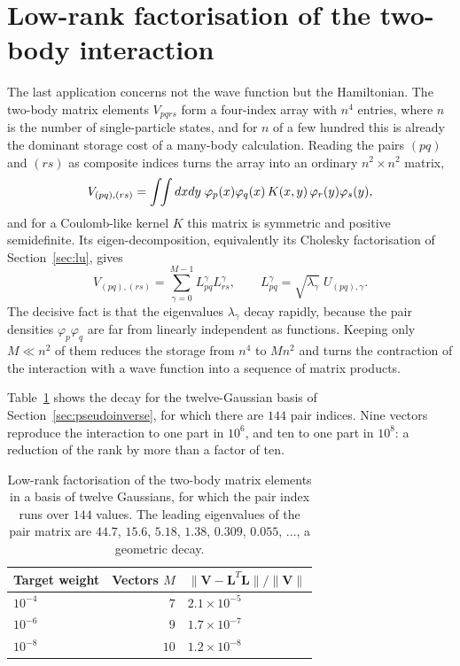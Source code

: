 \section{Low-rank factorisation of the two-body interaction}
\label{sec:twobodyfact}

The last application concerns not the wave function but the Hamiltonian.  The
two-body matrix elements $V_{pqrs}$ form a four-index array with $n^4$
entries, where $n$ is the number of single-particle states, and for $n$ of a
few hundred this is already the dominant storage cost of a many-body
calculation.  Reading the pairs $(pq)$ and $(rs)$ as composite indices turns
the array into an ordinary $n^2\times n^2$ matrix,
\begin{equation}
  V_{(pq),(rs)}
   = \int\!\!\int dxdy\;
     \varphi_p(x)\varphi_q(x)\,K(x,y)\,\varphi_r(y)\varphi_s(y),
  \label{eq:1-pairmatrix}
\end{equation}
and for a Coulomb-like kernel $K$ this matrix is symmetric and positive
semidefinite.  Its eigen-decomposition, equivalently its Cholesky
factorisation of Section~\ref{sec:lu}, gives
\begin{equation}
  V_{(pq),(rs)} = \sum_{\gamma=0}^{M-1} L^{\gamma}_{pq}L^{\gamma}_{rs},
  \qquad
  L^{\gamma}_{pq} = \sqrt{\lambda_{\gamma}}\;U_{(pq),\gamma} .
  \label{eq:1-cholvectors}
\end{equation}
The decisive fact is that the eigenvalues $\lambda_{\gamma}$ decay rapidly,
because the pair densities $\varphi_p\varphi_q$ are far from linearly
independent as functions.  Keeping only $M\ll n^2$ of them reduces the
storage from $n^4$ to $Mn^2$ and turns the contraction of the interaction with
a wave function into a sequence of matrix products.

Table~\ref{tab:density} shows the decay for the twelve-Gaussian basis of
Section~\ref{sec:pseudoinverse}, for which there are $144$ pair indices.  Nine
vectors reproduce the interaction to one part in $10^{6}$, and ten to one part
in $10^{8}$: a reduction of the rank by more than a factor of ten.

\begin{table}[h]
\centering
\renewcommand{\arraystretch}{1.25}
\setlength{\tabcolsep}{10pt}
\begin{tabular}{lrl}
\toprule
\textbf{Target weight} & \textbf{Vectors $M$} &
\textbf{$\|\bm{V}-\bm{L}^{T}\bm{L}\|/\|\bm{V}\|$}\\
\midrule
$10^{-4}$ & $7$  & $2.1\times10^{-5}$\\
$10^{-6}$ & $9$  & $1.7\times10^{-7}$\\
$10^{-8}$ & $10$ & $1.2\times10^{-8}$\\
\bottomrule
\end{tabular}
\caption{Low-rank factorisation of the two-body matrix elements in a basis of
twelve Gaussians, for which the pair index runs over $144$ values.  The
leading eigenvalues of the pair matrix are $44.7$, $15.6$, $5.18$, $1.38$,
$0.309$, $0.055$, $\dots$, a geometric decay.}
\label{tab:density}
\end{table}

